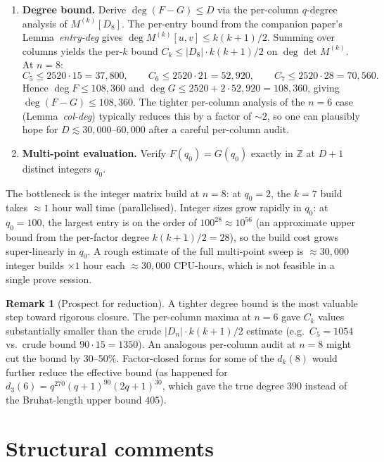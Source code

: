 \documentclass[11pt]{article}
\theoremstyle{definition}
\newtheorem{remark}[theorem]{Remark}
\begin{document}
\begin{enumerate}
\item \textbf{Degree bound.}  Derive $\deg(F - G) \leq D$ via the per-column $q$-degree analysis of $M^{(k)}[D_8]$.  The per-entry bound from the companion paper's Lemma~\emph{entry-deg} gives $\deg M^{(k)}[u,v] \leq k(k+1)/2$.  Summing over columns yields the per-$k$ bound $C_k \leq |D_8| \cdot k(k+1)/2$ on $\deg \det M^{(k)}$. At $n = 8$:
\[
C_5 \leq 2520 \cdot 15 = 37{,}800, \qquad
C_6 \leq 2520 \cdot 21 = 52{,}920, \qquad
C_7 \leq 2520 \cdot 28 = 70{,}560.
\]
Hence $\deg F \leq 108{,}360$ and $\deg G \leq 2520 + 2 \cdot 52{,}920 = 108{,}360$, giving $\deg(F - G) \leq 108{,}360$. The tighter per-column analysis of the $n = 6$ case (Lemma~\emph{col-deg}) typically reduces this by a factor of $\sim 2$, so one can plausibly hope for $D \lesssim 30{,}000\text{--}60{,}000$ after a careful per-column audit.

\item \textbf{Multi-point evaluation.}  Verify $F(q_0) = G(q_0)$ exactly in $\mathbb{Z}$ at $D + 1$ distinct integers $q_0$.
\end{enumerate}

The bottleneck is the integer matrix build at $n = 8$: at $q_0 = 2$, the $k = 7$ build takes $\approx 1$ hour wall time (parallelised).  Integer sizes grow rapidly in $q_0$: at $q_0 = 100$, the largest entry is on the order of $100^{28} \approx 10^{56}$ (an approximate upper bound from the per-factor degree $k(k+1)/2 = 28$), so the build cost grows super-linearly in $q_0$.  A rough estimate of the full multi-point sweep is $\approx 30{,}000$ integer builds $\times 1$ hour each $\approx 30{,}000$ CPU-hours, which is not feasible in a single prove session.

\begin{remark}[Prospect for reduction]
A tighter degree bound is the most valuable step toward rigorous closure. The per-column maxima at $n = 6$ gave $C_k$ values substantially smaller than the crude $|D_n| \cdot k(k+1)/2$ estimate (e.g.\ $C_5 = 1054$ vs.\ crude bound $90 \cdot 15 = 1350$). An analogous per-column audit at $n = 8$ might cut the bound by $30\text{--}50\%$.  Factor-closed forms for some of the $d_k(8)$ would further reduce the effective bound (as happened for $d_3(6) = q^{270}(q+1)^{90}(2q+1)^{30}$, which gave the true degree $390$ instead of the Bruhat-length upper bound $405$).
\end{remark}

\section{Structural comments}
\end{document}
